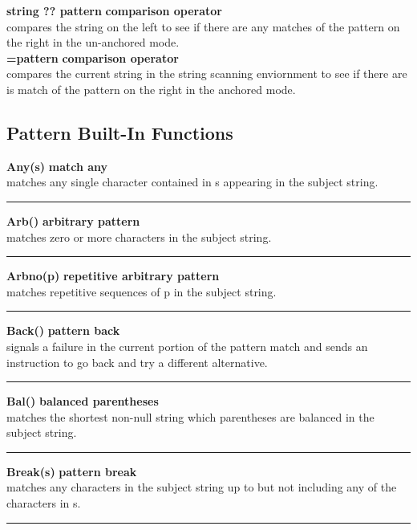 \documentclass{article}
\begin{document}
\noindent\textbf{string ?? pattern} \hfill\textbf{comparison operator}\\
compares the string on the left to see if there are any matches of the pattern on the right in the un-anchored mode.\\

\noindent\textbf{=pattern} \hfill\textbf{comparison operator}\\
compares the current string in the string scanning enviornment to see if there are is match of the pattern on the right in the anchored mode.\\

\subsection*{Pattern Built-In Functions}
\noindent\textbf{Any(s)} \hfill\textbf{match any}\\
matches any single character contained in s appearing in the subject string.\\
\noindent\rule{14cm}{0.1pt}

\noindent\textbf{Arb()} \hfill\textbf{arbitrary pattern}\\
matches zero or more characters in the subject string.\\
\noindent\rule{14cm}{0.1pt}

\noindent\textbf{Arbno(p)} \hfill\textbf{repetitive arbitrary pattern}\\
matches repetitive sequences of p in the subject string.\\
\noindent\rule{14cm}{0.1pt}

\noindent\textbf{Back()} \hfill\textbf{pattern back}\\
signals a failure in the current portion of the pattern match and sends an instruction to go back and try a different alternative.\\
\noindent\rule{14cm}{0.1pt}

\noindent\textbf{Bal()} \hfill\textbf{balanced parentheses}\\
matches the shortest non-null string which parentheses are balanced in the subject string.\\
\noindent\rule{14cm}{0.1pt}

\noindent\textbf{Break(s)} \hfill\textbf{pattern break}\\
matches any characters in the subject string up to but not including any of the characters in s.\\
\noindent\rule{14cm}{0.1pt}
\end{document}
